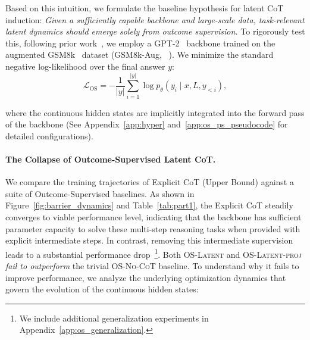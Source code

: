 Based on this intuition, we formulate the baseline hypothesis for latent CoT induction:
\textit{Given a sufficiently capable backbone and large-scale data, task-relevant latent dynamics should emerge solely from outcome supervision.}
To rigorously test this, following prior work~\citep{hao2025training}, we employ a GPT-2~\citep{radford2019language} backbone trained on the augmented GSM8k~\citep{cobbe2021trainingverifierssolvemath} dataset (GSM8k-Aug, ~\citealt{deng2023implicitchainthoughtreasoning}). We minimize the standard negative log-likelihood over the final answer $y$:
\begin{equation}
    \mathcal{L}_{\mathrm{OS}} = - \frac{1}{|y|} \sum_{i=1}^{|y|} \log p_{\theta}(y_i \mid x, L, y_{<i}),
\end{equation}

where the continuous hidden states are implicitly integrated into the forward pass of the backbone (See Appendix~\ref{app:hyper} and~\ref{app:os_ps_pseudocode} for detailed configurations).


\paragraph{The Collapse of Outcome-Supervised Latent CoT.}
\label{subsec:collapse_observation}
We compare the training trajectories of Explicit CoT (Upper Bound) against a suite of Outcome-Supervised baselines.
As shown in Figure~\ref{fig:barrier_dynamics} and Table~\ref{tab:part1}, the Explicit CoT steadily converges to viable performance level, indicating that the backbone has sufficient parameter capacity to solve these multi-step reasoning tasks when provided with explicit intermediate steps.
In contrast, removing this intermediate supervision leads to a substantial performance drop~\footnote{We include additional generalization experiments in Appendix~\ref{app:os_generalization}.}. Both \textsc{OS-Latent} and \textsc{OS-Latent-proj} \emph{fail to outperform} the trivial \textsc{OS-No-CoT} baseline. 
To understand why it fails to improve performance, we analyze the underlying optimization dynamics that govern the evolution of the continuous hidden states:



